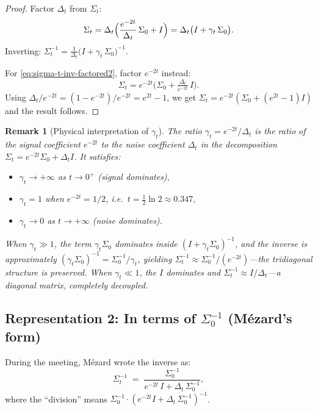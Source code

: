 \documentclass[11pt,a4paper]{article}
\newtheorem{remark}[theorem]{Remark}
\newcommand{\Dt}{\Delta_t}
\begin{document}
\begin{proof}
Factor $\Dt$ from $\Sigma_t$:
\[
  \Sigma_t = \Dt\Bigl(\frac{e^{-2t}}{\Dt}\,\Sigma_0 + I\Bigr) = \Dt\bigl(I + \gamma_t\,\Sigma_0\bigr).
\]
Inverting: $\Sigma_t^{-1} = \frac{1}{\Dt}\bigl(I + \gamma_t\,\Sigma_0\bigr)^{-1}$.

For \eqref{eq:sigma-t-inv-factored2}, factor $e^{-2t}$ instead:
\[
  \Sigma_t = e^{-2t}\bigl(\Sigma_0 + \tfrac{\Dt}{e^{-2t}}\,I\bigr).
\]
Using $\Dt / e^{-2t} = (1 - e^{-2t})/e^{-2t} = e^{2t} - 1$, we get $\Sigma_t = e^{-2t}(\Sigma_0 + (e^{2t}-1)I)$ and the result follows.
\end{proof}

\begin{remark}[Physical interpretation of $\gamma_t$]\label{rem:gamma}
The ratio $\gamma_t = e^{-2t}/\Dt$ is the ratio of the signal coefficient $e^{-2t}$ to the noise coefficient $\Dt$ in the decomposition $\Sigma_t = e^{-2t}\Sigma_0 + \Dt I$.  It satisfies:
\begin{itemize}[nosep]
  \item $\gamma_t \to +\infty$ as $t \to 0^+$ (signal dominates),
  \item $\gamma_t = 1$ when $e^{-2t} = 1/2$, i.e.\ $t = \tfrac{1}{2}\ln 2 \approx 0.347$,
  \item $\gamma_t \to 0$ as $t \to +\infty$ (noise dominates).
\end{itemize}
When $\gamma_t \gg 1$, the term $\gamma_t \Sigma_0$ dominates inside $(I + \gamma_t \Sigma_0)^{-1}$, and the inverse is approximately $(\gamma_t \Sigma_0)^{-1} = \Sigma_0^{-1}/\gamma_t$, yielding $\Sigma_t^{-1} \approx \Sigma_0^{-1}/(e^{-2t})$---the tridiagonal structure is preserved.  When $\gamma_t \ll 1$, the $I$ dominates and $\Sigma_t^{-1} \approx I/\Dt$---a diagonal matrix, completely decoupled.
\end{remark}

\subsection{Representation 2: In terms of $\Sigma_0^{-1}$ (M\'ezard's form)}
\label{sec:mezard-form}

During the meeting, M\'ezard wrote the inverse as:
\begin{equation}\label{eq:mezard-board}
  \Sigma_t^{-1} \;=\; \frac{\Sigma_0^{-1}}{e^{-2t}\,I + \Dt\,\Sigma_0^{-1}},
\end{equation}
where the ``division'' means $\Sigma_0^{-1}\cdot (e^{-2t}I + \Dt\,\Sigma_0^{-1})^{-1}$.
\end{document}

